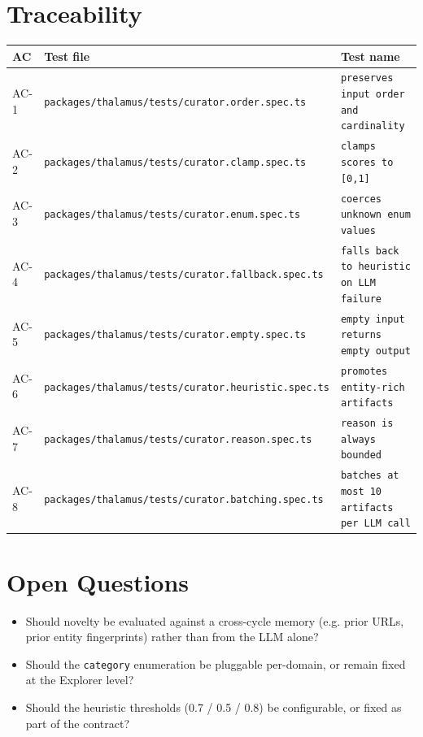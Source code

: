 \section{Traceability}

\begin{center}
\begin{tabular}{@{}lll@{}}
\toprule
AC & Test file & Test name \\
\midrule
AC-1 & \texttt{packages/thalamus/tests/curator.order.spec.ts} & \texttt{preserves input order and cardinality} \\
AC-2 & \texttt{packages/thalamus/tests/curator.clamp.spec.ts} & \texttt{clamps scores to [0,1]} \\
AC-3 & \texttt{packages/thalamus/tests/curator.enum.spec.ts} & \texttt{coerces unknown enum values} \\
AC-4 & \texttt{packages/thalamus/tests/curator.fallback.spec.ts} & \texttt{falls back to heuristic on LLM failure} \\
AC-5 & \texttt{packages/thalamus/tests/curator.empty.spec.ts} & \texttt{empty input returns empty output} \\
AC-6 & \texttt{packages/thalamus/tests/curator.heuristic.spec.ts} & \texttt{promotes entity-rich artifacts} \\
AC-7 & \texttt{packages/thalamus/tests/curator.reason.spec.ts} & \texttt{reason is always bounded} \\
AC-8 & \texttt{packages/thalamus/tests/curator.batching.spec.ts} & \texttt{batches at most 10 artifacts per LLM call} \\
\bottomrule
\end{tabular}
\end{center}

\section{Open Questions}
\begin{itemize}[leftmargin=1.2em]
  \item Should novelty be evaluated against a cross-cycle memory (e.g. prior URLs, prior entity fingerprints) rather than from the LLM alone?
  \item Should the \texttt{category} enumeration be pluggable per-domain, or remain fixed at the Explorer level?
  \item Should the heuristic thresholds (0.7 / 0.5 / 0.8) be configurable, or fixed as part of the contract?
\end{itemize}


